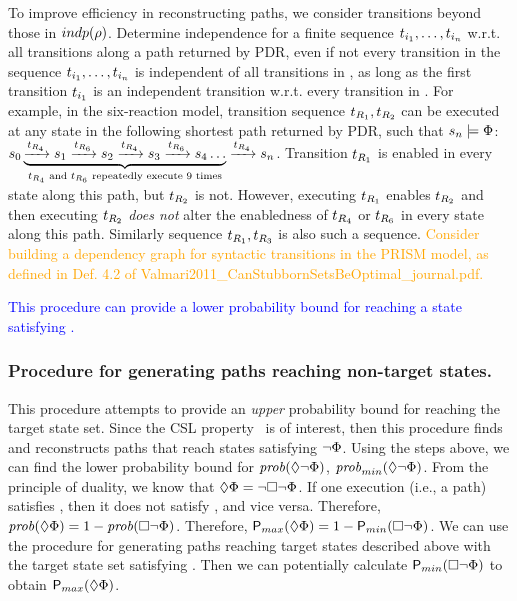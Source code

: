 To improve efficiency in reconstructing paths, we consider transitions
beyond those in \ensuremath{\indp{\rho}}. \textcolor{OliveGreen}{Determine independence for a finite
	sequence \ensuremath{\tranSeq{i_{1}}{i_{n}}} w.r.t. all
	transitions along a path returned by PDR, even if not every transition in the
	sequence \ensuremath{\tranSeq{i_{1}}{i_{n}}} is independent of all transitions in
	\pathFull, as long as the first transition
	\ensuremath{\tran{i_{1}}} is an independent transition w.r.t. every
	transition in \pathFull.} For example, in the six-reaction model,
transition sequence \ensuremath{\tran{R_{1}}, \tran{R_{2}}} can be executed at any state in the following
shortest path returned by PDR, such that \ensuremath{\state{n} \models
	\targetSt{}}:\\ \ensuremath{\initSt
	\underbrace{\xrightarrow{\tran{R_{4}}} \state{1}
		\xrightarrow{\tran{R_{6}}} \state{2} \xrightarrow{\tran{R_{4}}}
		\state{3} \xrightarrow{\tran{R_{6}}} \state{4} \dots}_{\text{\tran{R_{4}}
			and \tran{R_{6}} repeatedly execute 9 times}} \xrightarrow{\tran{R_{4}}} \state{n}}. Transition
\ensuremath{\tran{R_{1}}} is enabled in every state along this path,
but \ensuremath{\tran{R_{2}}} is not. However, executing
\ensuremath{\tran{R_{1}}} enables \ensuremath{\tran{R_{2}}} and then
executing \ensuremath{\tran{R_{2}}} \emph{does not} alter the
enabledness of \ensuremath{\tran{R_{4}}} or \ensuremath{\tran{R_{6}}}
in every state along this path. Similarly sequence
\ensuremath{\tran{R_{1}}, \tran{R_{3}}} is also such a
sequence. \textcolor{orange}{Consider building a dependency graph for
	syntactic transitions in the PRISM model, as defined in
	Def. 4.2 of
	Valmari2011\_CanStubbornSetsBeOptimal\_journal.pdf.}

\textcolor{blue}{This procedure can provide a lower probability bound for reaching a
	state satisfying \targetSt.}

\subsubsection*{Procedure for generating paths reaching non-target
	states. }
This procedure attempts to provide an \emph{upper} probability bound for reaching the
target state set. Since the CSL property \cslEventually\ is of interest,
then this procedure finds and reconstructs paths that reach states
satisfying \ensuremath{\lnot\targetSt}. Using the steps above, we can
find the lower probability bound for
\ensuremath{\prob(\eventuallyNot)}, \ensuremath{\prob_{min}
	(\eventuallyNot)}. From the principle of duality, we know that
\ensuremath{\eventually = \lnot \alwaysNot}. If one execution (i.e., a
path) satisfies \eventually, then it does not satisfy \alwaysNot, and
vice versa. Therefore, \ensuremath{\prob(\eventually) = 1 -
	\prob(\alwaysNot)}. Therefore, \ensuremath{\probMax{\eventually} =
	1- \probMin{\alwaysNot}}. We can use the procedure for generating
paths reaching target states described above with the target state set
satisfying \alwaysNot. Then we can potentially calculate
\ensuremath{\probMin{\alwaysNot}} to obtain \ensuremath{\probMax{\eventually}}.

